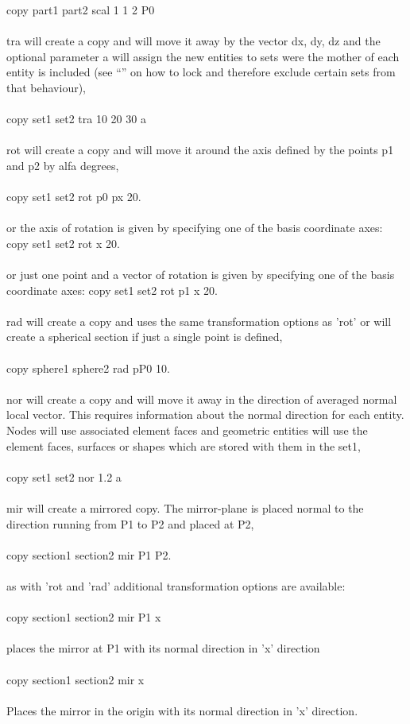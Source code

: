 \documentclass{article}
\begin{document}
copy part1 part2 scal 1 1 2 P0\\\\
tra will create a copy and will move it away by the vector dx, dy, dz and the optional parameter a will assign the new entities to sets were the mother of each entity is included (see ``'' on how to lock and therefore exclude certain sets from that behaviour),\\\\
copy set1 set2 tra 10 20 30 a\\\\
rot will create a copy and will move it around the axis defined by the points p1 and p2 by alfa degrees,\\\\
copy set1 set2 rot p0 px 20.\\\\
or the axis of rotation is given by specifying one of the basis coordinate axes:
copy set1 set2 rot x 20.\\\\
or just one point and a vector of rotation is given by specifying one of the basis coordinate axes:
copy set1 set2 rot p1 x 20.\\\\
rad will create a copy and uses the same transformation options as 'rot' or will create a spherical section if just a single point is defined,\\\\
copy sphere1 sphere2 rad pP0 10.\\\\
nor will create a copy and will move it away in the direction of averaged normal local vector. This requires information about the normal direction for each entity. Nodes will use associated element faces and geometric entities will use the element faces, surfaces or shapes which are stored with them in the set1,\\\\
copy set1 set2 nor 1.2 a\\\\
mir will create a mirrored copy. The mirror-plane is placed normal to the direction running from P1 to P2 and placed at P2,\\\\
copy section1 section2 mir P1 P2.\\\\
as with 'rot and 'rad' additional transformation options are available:\\\\
copy section1 section2 mir P1 x\\\\
places the mirror at P1 with its normal direction in 'x' direction\\\\
copy section1 section2 mir x\\\\
Places the mirror in the origin with its normal direction in 'x' direction.
\end{document}
